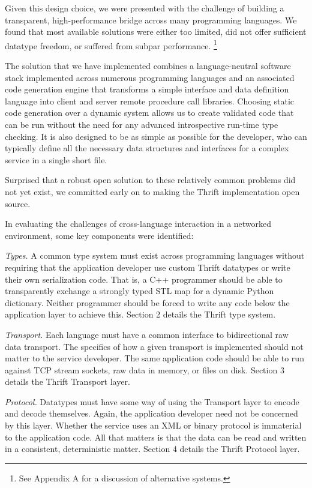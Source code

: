 \documentclass[nocopyrightspace,blockstyle]{sigplanconf}
\begin{document}
Given this design choice, we were presented with the challenge of building
a transparent, high-performance bridge across many programming languages.
We found that most available solutions were either too limited, did not offer
sufficient datatype freedom, or suffered from subpar performance.
\footnote{See Appendix A for a discussion of alternative systems.}

The solution that we have implemented combines a language-neutral software
stack implemented across numerous programming languages and an associated code
generation engine that transforms a simple interface and data definition
language into client and server remote procedure call libraries.
Choosing static code generation over a dynamic system allows us to create
validated code that can be run without the need for
any advanced introspective run-time type checking. It is also designed to
be as simple as possible for the developer, who can typically define all
the necessary data structures and interfaces for a complex service in a single
short file.

Surprised that a robust open solution to these relatively common problems
did not yet exist, we committed early on to making the Thrift implementation
open source.

In evaluating the challenges of cross-language interaction in a networked
environment, some key components were identified:

\textit{Types.} A common type system must exist across programming languages
without requiring that the application developer use custom Thrift datatypes
or write their own serialization code. That is,
a C++ programmer should be able to transparently exchange a strongly typed
STL map for a dynamic Python dictionary. Neither
programmer should be forced to write any code below the application layer
to achieve this. Section 2 details the Thrift type system. 

\textit{Transport.} Each language must have a common interface to
bidirectional raw data transport. The specifics of how a given
transport is implemented should not matter to the service developer.
The same application code should be able to run against TCP stream sockets,
raw data in memory, or files on disk. Section 3 details the Thrift Transport
layer.

\textit{Protocol.} Datatypes must have some way of using the Transport
layer to encode and decode themselves. Again, the application
developer need not be concerned by this layer. Whether the service uses
an XML or binary protocol is immaterial to the application code.
All that matters is that the data can be read and written in a consistent,
deterministic matter. Section 4 details the Thrift Protocol layer.
\end{document}
